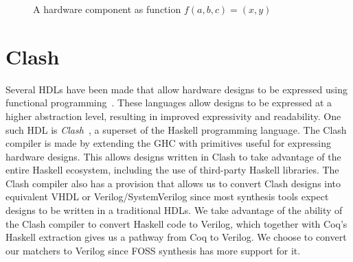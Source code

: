 \begin{figure}
  \begin{center}
    
  \end{center}
  \caption{A hardware component as function $f(a, b, c) = (x, y)$}
  \label{fig:hw-fn}
\end{figure}

\section{Clash}
Several \glspl{HDL} have been made that allow hardware designs to be
expressed using functional
programming~\cite{fpinhwsurvey,bachrach2012chisel,ray2023hardcaml}.
These languages allow designs to be expressed at a higher abstraction level,
resulting in improved expressivity and readability.
One such \gls{HDL} is \emph{Clash}~\cite{clash2010}, a superset of the
Haskell programming language.
The Clash compiler is made by extending the \gls{GHC} with primitives
useful for expressing hardware designs.
This allows designs written in Clash to take advantage of the entire
Haskell ecosystem, including the use of third-party Haskell libraries.
%
The Clash compiler also has a provision that allows us to convert Clash
designs into equivalent VHDL or Verilog/SystemVerilog since most
synthesis tools expect designs to be written in a traditional
\glspl{HDL}.
We take advantage of the ability of the Clash compiler to convert
Haskell code to Verilog, which together with Coq's Haskell extraction
gives us a pathway from Coq to Verilog.
We choose to convert our matchers to Verilog since \gls{FOSS}
synthesis has more support for it.


